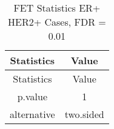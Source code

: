 \documentclass[]{article}
\begin{document}
\begin{longtable}[]{@{}cc@{}}
\caption{FET Statistics ER+ HER2+ Cases, FDR = 0.01}\tabularnewline
\toprule
\begin{minipage}[b]{0.18\columnwidth}\centering\strut
Statistics\strut
\end{minipage} & \begin{minipage}[b]{0.14\columnwidth}\centering\strut
Value\strut
\end{minipage}\tabularnewline
\midrule
\endfirsthead
\toprule
\begin{minipage}[b]{0.18\columnwidth}\centering\strut
Statistics\strut
\end{minipage} & \begin{minipage}[b]{0.14\columnwidth}\centering\strut
Value\strut
\end{minipage}\tabularnewline
\midrule
\endhead
\begin{minipage}[t]{0.18\columnwidth}\centering\strut
p.value\strut
\end{minipage} & \begin{minipage}[t]{0.14\columnwidth}\centering\strut
1\strut
\end{minipage}\tabularnewline
\begin{minipage}[t]{0.18\columnwidth}\centering\strut
alternative\strut
\end{minipage} & \begin{minipage}[t]{0.14\columnwidth}\centering\strut
two.sided\strut
\end{minipage}\tabularnewline
\bottomrule
\end{longtable}

\pagebreak
\end{document}
